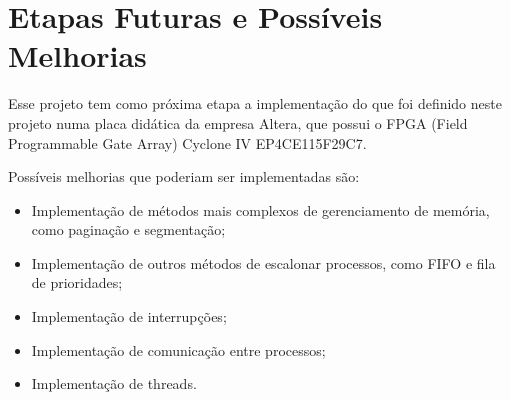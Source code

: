 \section{Etapas Futuras e Possíveis Melhorias}

Esse projeto tem como próxima etapa a implementação do que foi definido neste projeto numa placa didática da empresa Altera, que possui o FPGA (Field Programmable Gate Array) Cyclone IV EP4CE115F29C7.

Possíveis melhorias que poderiam ser implementadas são:

\begin{itemize}
	\item Implementação de métodos mais complexos de gerenciamento de memória, como paginação e segmentação;
	
	\item Implementação de outros métodos de escalonar processos, como FIFO e fila de prioridades;
	
	\item Implementação de interrupções; 
	
	\item Implementação de comunicação entre processos;

	\item Implementação de threads.
\end{itemize}